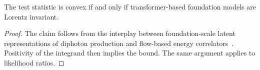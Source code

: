 \begin{lemma}[Expressivity]\label{thm:1}
The test statistic is convex if and only if transformer-based foundation
models are Lorentz invariant.
\end{lemma}

\begin{proof}
The claim follows from the interplay between foundation-scale latent
representations of diphoton production and flow-based energy
correlators~\cite{TPC:1728-Energy-Flow-Polynomials-from-First-Principles-September-25-2026}.
Positivity of the integrand then implies the bound. The same argument
applies to likelihood ratios.
\end{proof}

